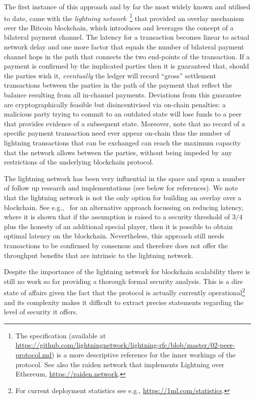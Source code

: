The first instance of this approach and by far the most widely known and
utilised to date, came with the \emph{lightning
network}~\cite{lightning}\footnote{The specification (available at
\url{https://github.com/lightningnetwork/lightning-rfc/blob/master/02-peer-protocol.md})
is a more descriptive reference for the inner workings of the protocol.
See also the raiden network that implements Lightning over Ethereum,
\url{https://raiden.network}.} that provided an overlay mechanism over the Bitcoin
blockchain, which introduces and leverages the concept of a bilateral payment channel. The
latency for a transaction becomes linear to actual network delay and one more
factor that equals the number of bilateral payment channel hops in the path that
connects the two end-points of the transaction. If a
payment is confirmed by the implicated parties then it is guaranteed that,
should the parties wish it, \emph{eventually} the ledger will record
``gross'' settlement transactions between the parties in the path of the payment
that reflect the balance resulting from all in-channel payments. Deviations from
this guarantee are
cryptographically feasible but disincentivised via on-chain
penalties: a malicious party trying
to commit to an outdated state will lose funds to a peer that provides evidence
of a subsequent state. Moreover, note that no record of a specific payment
transaction need ever appear on-chain thus the number of lightning transactions
that can be exchanged can reach the maximum capacity that the network allows between
the parties, without being impeded by any restrictions of the underlying
blockchain protocol.

The lightning network has been very influential in the space and spun a number
of follow up research and implementations (see below for references). We note
that the lightning network is not the only option for building an overlay over a
blockchain. See e.g.,~\cite{DBLP:conf/eurocrypt/PassS18} for an alternative
approach focussing on reducing latency, where it is shown that if the
assumption is raised to a security threshold of $3/4$ plus the honesty of an
additional special player, then it is possible to obtain optimal latency on the
blockchain.
Nevertheless, this approach still needs transactions to be confirmed by
consensus and therefore does not offer the throughput benefits that are
intrinsic to the lightning network.

Despite the importance of the lightning network for blockchain scalability there
is still no work so far providing a thorough formal security analysis. This is a
dire state of affairs given the fact that the protocol is actually currently
operational\footnote{For current deployment statistics see e.g.,
\url{https://1ml.com/statistics}.} and its complexity makes it difficult to
extract precise statements regarding the level of security it offers.

